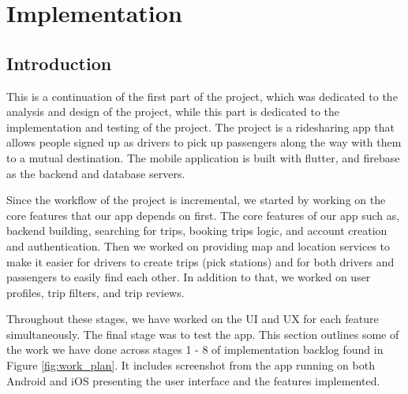 \documentclass[a4paper, 12pt]{report} %
\begin{document}
    \pagebreak
    \section{Implementation}
        \subsection{Introduction}
            This is a continuation of the first part of the project, which was dedicated to the analysis and design of the project, while this part is dedicated to the implementation and testing of the project. The project is a ridesharing app that allows people signed up as drivers to pick up passengers along the way with them to a mutual destination. The mobile application is built with flutter, and firebase as the backend and database servers.

            Since the workflow of the project is incremental, we started by working on the core features that our app depends on first. The core features of our app such as, backend building, searching for trips, booking trips logic, and account creation and authentication. Then we worked on providing map and location services to make it easier for drivers to create trips (pick stations) and for both drivers and passengers to easily find each other. In addition to that, we worked on user profiles, trip filters, and trip reviews. 
            
            Throughout these stages, we have worked on the UI and UX for each feature simultaneously. The final stage was to test the app. This section outlines some of the work we have done across stages 1 - 8 of implementation backlog found in Figure \ref{fig:work_plan}. It includes screenshot from the app running on both Android and iOS presenting the user interface and the features implemented.
\end{document}
